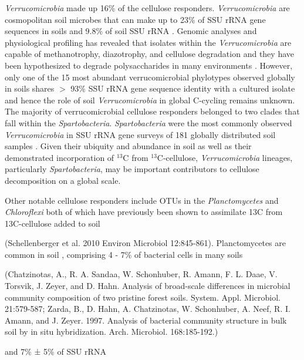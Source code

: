 \textit{Verrucomicrobia} made up 16\% of the cellulose responders.
\textit{Verrucomicrobia} are cosmopolitan soil microbes \citep{Bergmann_2011} that can make up
to 23\% of SSU rRNA gene sequences in soils \citep{Bergmann_2011} and 9.8\% of soil SSU rRNA
\citep{Buckley_2001}. Genomic analyses and physiological profiling has revealed that isolates
within the \textit{Verrucomicrobia} are capable of methanotrophy,
diazotrophy, and cellulose degradation \citep{Wertz_2011,Otsuka_2012} and they
have been hypothesized to degrade polysaccharides in many environments
\citep{Fierer_2013,10543821,Herlemann_2013}. However, only one of the
15 most abundant verrucomicrobial phylotypes observed globally in soils shares
$>$ 93\% SSU rRNA gene sequence identity with a cultured isolate \citep{Bergmann_2011} and hence
the role of soil \textit{Verrucomicrobia} in global C-cycling remains unknown.
The majority of verrucomicrobial cellulose responders belonged to two clades
that fall within the \textit{Spartobacteria}. \textit{Spartobacteria} were the
most commonly observed \textit{Verrucomicrobia} in SSU rRNA gene surveys of
181 globally distributed soil samples \citep{Bergmann_2011}. Given their ubiquity and abundance
in soil as well as their demonstrated incorporation of $^{13}$C from
$^{13}$C-cellulose, \textit{Verrucomicrobia} lineages, particularly
\textit{Spartobacteria}, may be important contributors to cellulose
decomposition on a global scale. 

Other notable cellulose responders include OTUs in the \textit{Planctomycetes}
and \textit{Chloroflexi} both of which have previously been shown to
assimilate 13C from 13C-cellulose added to soil 

(Schellenberger et al. 2010 Environ Microbiol 12:845-861). Planctomycetes
are common in soil \citep{Jannsen2006}, comprising 4 - 7\% of
bacterial cells in many soils 

(Chatzinotas, A., R. A. Sandaa, W. Schonhuber, R. Amann, F. L. Daae, V.
Torsvik, J. Zeyer, and D. Hahn. Analysis of broad-scale differences in
microbial community composition of two pristine forest soils. System. Appl.
Microbiol. 21:579-587; Zarda, B., D. Hahn, A. Chatzinotas, W. Schonhuber, A.
Neef, R. I. Amann, and J. Zeyer. 1997. Analysis of bacterial community
structure in bulk soil by in situ hybridization. Arch. Microbiol. 168:185-192.)

and 7\% ± 5\% of SSU rRNA 

